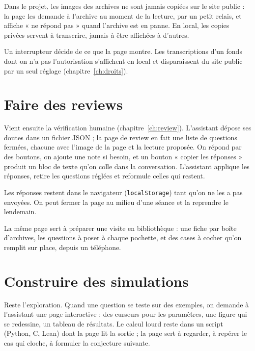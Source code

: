 \begin{exemple}
Dans le projet, les images des archives ne sont jamais copiées sur le site public : la page
les demande à l'archive au moment de la lecture, par un petit relais, et affiche « ne
répond pas » quand l'archive est en panne. En local, les copies privées servent à
transcrire, jamais à être affichées à d'autres.
\end{exemple}

Un interrupteur décide de ce que la page montre. Les transcriptions d'un fonds dont on n'a
pas l'autorisation s'affichent en local et disparaissent du site public par un seul réglage
(chapitre~\ref{ch:droits}).

\section{Faire des reviews}

Vient ensuite la vérification humaine (chapitre~\ref{ch:review}). L'assistant
dépose ses doutes dans un fichier JSON ; la page de review en fait une liste de questions
fermées, chacune avec l'image de la page et la lecture proposée. On répond par des
boutons, on ajoute une note si besoin, et un bouton « copier les réponses » produit un bloc
de texte qu'on colle dans la conversation. L'assistant applique les réponses, retire les
questions réglées et reformule celles qui restent.

\begin{tipblock}
Les réponses restent dans le navigateur (\texttt{localStorage}) tant qu'on ne les a pas
envoyées. On peut fermer la page au milieu d'une séance et la reprendre le lendemain.
\end{tipblock}

La même page sert à préparer une visite en bibliothèque : une fiche par boîte d'archives,
les questions à poser à chaque pochette, et des cases à cocher qu'on remplit sur place,
depuis un téléphone.

\section{Construire des simulations}

Reste l'exploration. Quand une question se teste sur des exemples, on
demande à l'assistant une page interactive : des curseurs pour les paramètres, une figure
qui se redessine, un tableau de résultats. Le calcul lourd reste dans un script (Python,
C, Lean) dont la page lit la sortie ; la page sert à regarder, à repérer le cas qui
cloche, à formuler la conjecture suivante.

